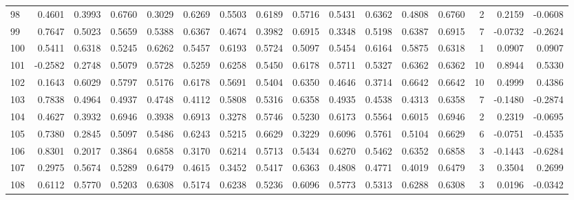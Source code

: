 \begin{tabular}{lrrrrrrrrrrrrrrr}
98  &      0.4601 &  0.3993 &  0.6760 &  0.3029 &  0.6269 &  0.5503 &  0.6189 &  0.5716 &  0.5431 &  0.6362 &   0.4808 &     0.6760 &      2 &                    0.2159 &                    -0.0608 \\
99  &      0.7647 &  0.5023 &  0.5659 &  0.5388 &  0.6367 &  0.4674 &  0.3982 &  0.6915 &  0.3348 &  0.5198 &   0.6387 &     0.6915 &      7 &                   -0.0732 &                    -0.2624 \\
100 &      0.5411 &  0.6318 &  0.5245 &  0.6262 &  0.5457 &  0.6193 &  0.5724 &  0.5097 &  0.5454 &  0.6164 &   0.5875 &     0.6318 &      1 &                    0.0907 &                     0.0907 \\
101 &     -0.2582 &  0.2748 &  0.5079 &  0.5728 &  0.5259 &  0.6258 &  0.5450 &  0.6178 &  0.5711 &  0.5327 &   0.6362 &     0.6362 &     10 &                    0.8944 &                     0.5330 \\
102 &      0.1643 &  0.6029 &  0.5797 &  0.5176 &  0.6178 &  0.5691 &  0.5404 &  0.6350 &  0.4646 &  0.3714 &   0.6642 &     0.6642 &     10 &                    0.4999 &                     0.4386 \\
103 &      0.7838 &  0.4964 &  0.4937 &  0.4748 &  0.4112 &  0.5808 &  0.5316 &  0.6358 &  0.4935 &  0.4538 &   0.4313 &     0.6358 &      7 &                   -0.1480 &                    -0.2874 \\
104 &      0.4627 &  0.3932 &  0.6946 &  0.3938 &  0.6913 &  0.3278 &  0.5746 &  0.5230 &  0.6173 &  0.5564 &   0.6015 &     0.6946 &      2 &                    0.2319 &                    -0.0695 \\
105 &      0.7380 &  0.2845 &  0.5097 &  0.5486 &  0.6243 &  0.5215 &  0.6629 &  0.3229 &  0.6096 &  0.5761 &   0.5104 &     0.6629 &      6 &                   -0.0751 &                    -0.4535 \\
106 &      0.8301 &  0.2017 &  0.3864 &  0.6858 &  0.3170 &  0.6214 &  0.5713 &  0.5434 &  0.6270 &  0.5462 &   0.6352 &     0.6858 &      3 &                   -0.1443 &                    -0.6284 \\
107 &      0.2975 &  0.5674 &  0.5289 &  0.6479 &  0.4615 &  0.3452 &  0.5417 &  0.6363 &  0.4808 &  0.4771 &   0.4019 &     0.6479 &      3 &                    0.3504 &                     0.2699 \\
108 &      0.6112 &  0.5770 &  0.5203 &  0.6308 &  0.5174 &  0.6238 &  0.5236 &  0.6096 &  0.5773 &  0.5313 &   0.6288 &     0.6308 &      3 &                    0.0196 &                    -0.0342 \\

\end{tabular}
